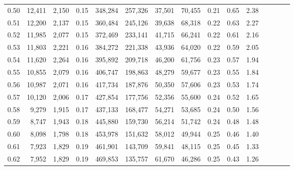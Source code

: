 \begin{tabular}{rrrcrrrrrrrrrrr}
0.50 &  12,411 &  2,150 &                                       0.15 &  348,284 &  257,326 &   37,501 &   70,455 &  0.21 &  0.65 &                         2.38 \\
0.51 &  12,200 &  2,137 &                                       0.15 &  360,484 &  245,126 &   39,638 &   68,318 &  0.22 &  0.63 &                         2.27 \\
0.52 &  11,985 &  2,077 &                                       0.15 &  372,469 &  233,141 &   41,715 &   66,241 &  0.22 &  0.61 &                         2.16 \\
0.53 &  11,803 &  2,221 &                                       0.16 &  384,272 &  221,338 &   43,936 &   64,020 &  0.22 &  0.59 &                         2.05 \\
0.54 &  11,620 &  2,264 &                                       0.16 &  395,892 &  209,718 &   46,200 &   61,756 &  0.23 &  0.57 &                         1.94 \\
0.55 &  10,855 &  2,079 &                                       0.16 &  406,747 &  198,863 &   48,279 &   59,677 &  0.23 &  0.55 &                         1.84 \\
0.56 &  10,987 &  2,071 &                                       0.16 &  417,734 &  187,876 &   50,350 &   57,606 &  0.23 &  0.53 &                         1.74 \\
0.57 &  10,120 &  2,006 &                                       0.17 &  427,854 &  177,756 &   52,356 &   55,600 &  0.24 &  0.52 &                         1.65 \\
0.58 &   9,279 &  1,915 &                                       0.17 &  437,133 &  168,477 &   54,271 &   53,685 &  0.24 &  0.50 &                         1.56 \\
0.59 &   8,747 &  1,943 &                                       0.18 &  445,880 &  159,730 &   56,214 &   51,742 &  0.24 &  0.48 &                         1.48 \\
0.60 &   8,098 &  1,798 &                                       0.18 &  453,978 &  151,632 &   58,012 &   49,944 &  0.25 &  0.46 &                         1.40 \\
0.61 &   7,923 &  1,829 &                                       0.19 &  461,901 &  143,709 &   59,841 &   48,115 &  0.25 &  0.45 &                         1.33 \\
0.62 &   7,952 &  1,829 &                                       0.19 &  469,853 &  135,757 &   61,670 &   46,286 &  0.25 &  0.43 &                         1.26 \\

\end{tabular}
